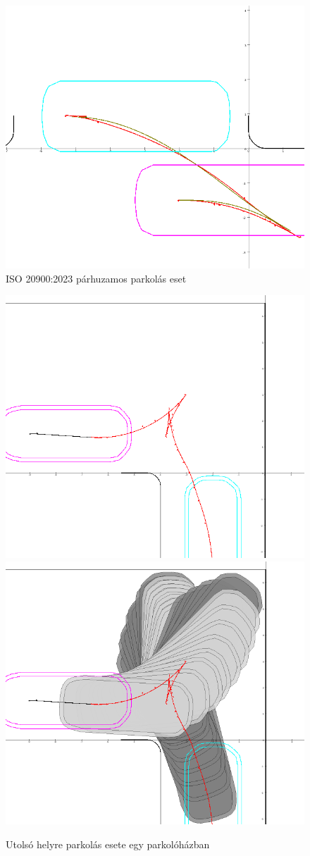 \documentclass{article}
\begin{document}
\begin{figure}[ht]
    \centering
    \includegraphics[width=0.5\linewidth]{images/scenes/ISO-parallel.png}
    \caption{ISO 20900:2023 párhuzamos parkolás eset}
    \label{fig:ISO-parallel}
\end{figure}

\begin{figure}[ht]
    \centering
    \includegraphics[width=0.45\linewidth]{images/scenes/lastSlot.png}
    \hspace{1em}
    \includegraphics[width=0.45\linewidth]{images/scenes/lastSlot-contour.png}
    \caption{Utolsó helyre parkolás esete egy parkolóházban}
    \label{fig:spec-lastSlot}
\end{figure}




\clearpage
\printbibliography[title=Bibliográfia]
\end{document}
